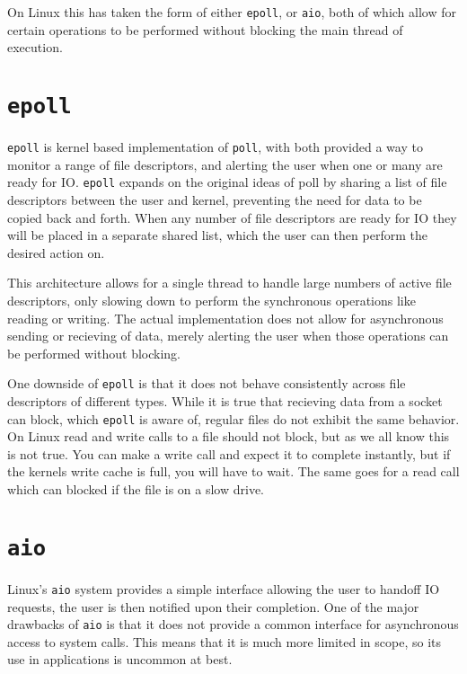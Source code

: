 \documentclass[letterpaper, 10pt, twocolumn]{article}
\begin{document}
On Linux this has taken the form of either \texttt{epoll}, or \texttt{aio}, both of which allow for certain operations to be performed without blocking the main thread of execution.

\section{\texttt{epoll}}
\label{sec:orgc7820b0}
\texttt{epoll} is kernel based implementation of \texttt{poll}, with both provided a way to monitor a range of file descriptors, and alerting the user when one or many are ready for IO. \texttt{epoll} expands on the original ideas of poll by sharing a list of file descriptors between the user and kernel, preventing the need for data to be copied back and forth. When any number of file descriptors are ready for IO they will be placed in a separate shared list, which the user can then perform the desired action on.

This architecture allows for a single thread to handle large numbers of active file descriptors, only slowing down to perform the synchronous operations like reading or writing. The actual implementation does not allow for asynchronous sending or recieving of data, merely alerting the user when those operations can be performed without blocking.

One downside of \texttt{epoll} is that it does not behave consistently across file descriptors of different types. While it is true that recieving data from a socket can block, which \texttt{epoll} is aware of, regular files do not exhibit the same behavior. On Linux read and write calls to a file should not block, but as we all know this is not true. You can make a write call and expect it to complete instantly, but if the kernels write cache is full, you will have to wait. The same goes for a read call which can blocked if the file is on a slow drive.

\section{\texttt{aio}}
\label{sec:orgf4936b1}
Linux's \texttt{aio} system provides a simple interface allowing the user to handoff IO requests, the user is then notified upon their completion. One of the major drawbacks of \texttt{aio} is that it does not provide a common interface for asynchronous access to system calls. This means that it is much more limited in scope, so its use in applications is uncommon at best.
\end{document}
